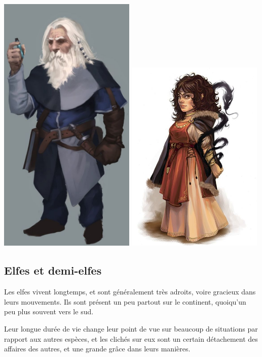 \documentclass[10pt,a4paper]{book}
\begin{document}
\includegraphics[width=0.49\textwidth]{nain 1}
\includegraphics[width=0.49\textwidth]{naine 1}
\subsection{Elfes et demi-elfes}
Les elfes vivent longtemps, et sont généralement très adroits, voire gracieux dans leurs mouvements. Ils sont présent un peu partout sur le continent, quoiqu'un peu plus souvent vers le sud.

Leur longue durée de vie change leur point de vue sur beaucoup de situations par rapport aux autres espèces, et les clichés sur eux sont un certain détachement des affaires des autres, et une grande grâce dans leurs manières.
\end{document}
